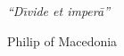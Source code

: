 \thispagestyle{empty}  %
\null\vfill

\textit{``D\={\i}vide et imper\={a}''}

\begin{flushright}
Philip of Macedonia
\end{flushright}

\vfill\vfill\vfill\vfill\vfill\vfill\null